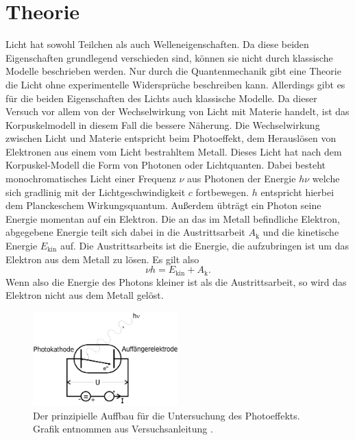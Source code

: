 \section{Theorie}
\label{sec:Theorie}

Licht hat sowohl Teilchen als auch Welleneigenschaften.
Da diese beiden Eigenschaften grundlegend verschieden sind, können sie nicht durch klassische Modelle beschrieben werden.
Nur durch die Quantenmechanik gibt eine Theorie die Licht ohne experimentelle Widersprüche beschreiben kann.
Allerdings gibt es für die beiden Eigenschaften des Lichts auch klassische Modelle.
Da dieser Versuch vor allem von der Wechselwirkung von Licht mit Materie handelt, ist das Korpuskelmodell in diesem Fall die bessere Näherung.
Die Wechselwirkung zwischen Licht und Materie entspricht beim Photoeffekt, dem Herauslösen von Elektronen aus einem vom Licht bestrahltem Metall.
Dieses Licht hat nach dem Korpuskel-Modell die Form von Photonen oder Lichtquanten.
Dabei besteht monochromatisches Licht einer Frequenz $\nu$ aus Photonen der Energie $h\nu$ welche sich gradlinig mit der Lichtgeschwindigkeit $c$ fortbewegen.
$h$ entspricht hierbei dem Planckeschem Wirkungsquantum.
Außerdem übträgt ein Photon seine Energie momentan auf ein Elektron.
Die an das im Metall befindliche Elektron, abgegebene Energie teilt sich dabei in die Austrittsarbeit $A_\text{k}$ und die kinetische Energie $E_\text{kin}$ auf.
Die Austrittsarbeits ist die Energie, die aufzubringen ist um das Elektron aus dem Metall zu lösen.
Es gilt also 
\begin{equation}
    \nu h = E_\text{kin} + A_\text{k}.
\end{equation}
Wenn also die Energie des Photons kleiner ist als die Austrittsarbeit, so wird das Elektron nicht aus dem Metall gelöst.


\FloatBarrier

\begin{figure}
\centering
    \includegraphics[width=0.5\textwidth]{content/data/aufbau.png}
    \caption{Der prinzipielle Auffbau für die Untersuchung des Photoeffekts. Grafik entnommen aus Versuchsanleitung \cite{anleitung}.}
    \label{fig:aufbau}
\end{figure}

